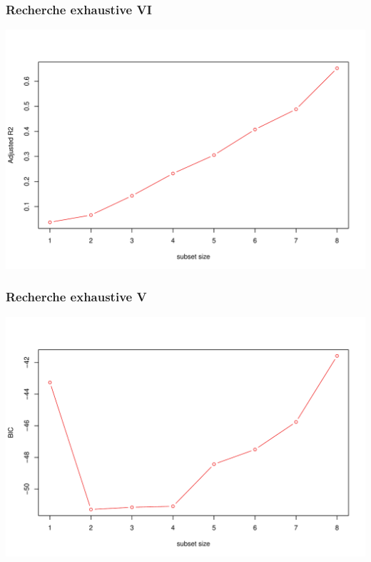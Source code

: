 \documentclass{beamer}\usepackage[]{graphicx}\usepackage[]{color}
\newenvironment{knitrout}{}{} %
\begin{document}
\begin{frame}
  \frametitle{Recherche exhaustive VI}

\begin{knitrout}\scriptsize
{}\color{fgcolor}
\includegraphics[width=\textwidth]{figures/subsetunnamed-chunk-28-1} 

\end{knitrout}

\end{frame}

\begin{frame}
  \frametitle{Recherche exhaustive V}

\begin{knitrout}\scriptsize
{}\color{fgcolor}
\includegraphics[width=\textwidth]{figures/subsetunnamed-chunk-29-1} 

\end{knitrout}

\end{frame}
\end{document}
